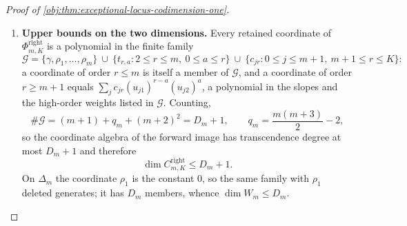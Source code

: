 \documentclass[11pt]{article}
\begin{document}
\begin{proof}[Proof of \cref{obj:thm:exceptional-locus-codimension-one}]
\begin{enumerate}
\item \textbf{Upper bounds on the two dimensions.}  Every retained coordinate of \(\Phi^{\mathrm{right}}_{m,K}\) is a polynomial in the finite family
\[
\mathcal G=\{\gamma,\rho_1,\ldots,\rho_m\}
\ \cup\ \{t_{r,a}:2\le r\le m,\ 0\le a\le r\}
\ \cup\ \{c_{jr}:0\le j\le m+1,\ m+1\le r\le K\}:
\]
a coordinate of order \(r\le m\) is itself a member of \(\mathcal G\), and a coordinate of order \(r\ge m+1\) equals \(\sum_j c_{jr}(u_{j1})^{r-a}(u_{j2})^{a}\), a polynomial in the slopes and the high-order weights listed in \(\mathcal G\).  Counting,
\[
\#\mathcal G=(m+1)+q_m+(m+2)^2=D_m+1,
\qquad q_m=\frac{m(m+3)}{2}-2 ,
\]
so the coordinate algebra of the forward image has transcendence degree at most \(D_m+1\) and therefore
\[
\dim C^{\mathrm{right}}_{m,K}\le D_m+1 .
\]
On \(\Delta_m\) the coordinate \(\rho_1\) is the constant \(0\), so the same family with \(\rho_1\) deleted generates; it has \(D_m\) members, whence \(\dim W_m\le D_m\).


\end{enumerate}
\end{proof}
\end{document}
